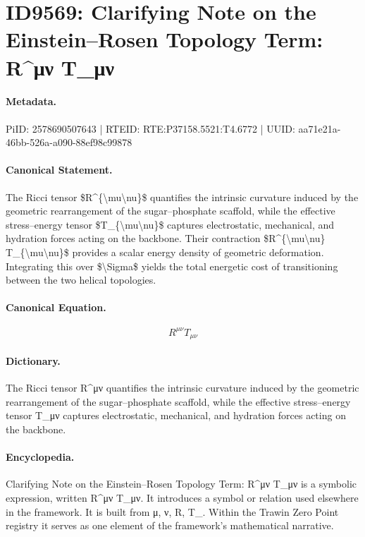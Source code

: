 \section*{ID9569: Clarifying Note on the Einstein–Rosen Topology Term: R\textasciicircum{}μν T\_μν}
\paragraph{Metadata.}
PiID: 2578690507643 | RTEID: RTE:P37158.5521:T4.6772 | UUID: aa71e21a-46bb-526a-a090-88ef98c99878

\paragraph{Canonical Statement.}
The Ricci tensor \$R\textasciicircum{}\{\textbackslash{}mu\textbackslash{}nu\}\$ quantifies the intrinsic curvature induced by the geometric rearrangement of the sugar–phosphate scaffold, while the effective stress–energy tensor \$T\_\{\textbackslash{}mu\textbackslash{}nu\}\$ captures electrostatic, mechanical, and hydration forces acting on the backbone. Their contraction \$R\textasciicircum{}\{\textbackslash{}mu\textbackslash{}nu\} T\_\{\textbackslash{}mu\textbackslash{}nu\}\$ provides a scalar energy density of geometric deformation. Integrating this over \$\textbackslash{}Sigma\$ yields the total energetic cost of transitioning between the two helical topologies.

\paragraph{Canonical Equation.}
\[
R^{\mu\nu} T_{\mu\nu}
\]

\paragraph{Dictionary.}
The Ricci tensor R\textasciicircum{}μν quantifies the intrinsic curvature induced by the geometric rearrangement of the sugar–phosphate scaffold, while the effective stress–energy tensor T\_μν captures electrostatic, mechanical, and hydration forces acting on the backbone.

\paragraph{Encyclopedia.}
Clarifying Note on the Einstein–Rosen Topology Term: R\textasciicircum{}μν T\_μν is a symbolic expression, written R\textasciicircum{}μν T\_μν. It introduces a symbol or relation used elsewhere in the framework. It is built from μ, ν, R, T\_. Within the Trawin Zero Point registry it serves as one element of the framework's mathematical narrative.
